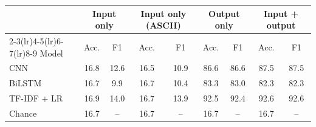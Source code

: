 \begin{tabular}{lcccccccc}
\toprule
 & \multicolumn{2}{c}{Input only} & \multicolumn{2}{c}{Input only (ASCII)} & \multicolumn{2}{c}{Output only} & \multicolumn{2}{c}{Input + output} \\
\cmidrule(lr){2-3}\cmidrule(lr){4-5}\cmidrule(lr){6-7}\cmidrule(lr){8-9}
Model & Acc. & F1 & Acc. & F1 & Acc. & F1 & Acc. & F1 \\
\midrule
CNN & 16.8 & 12.6 & 16.5 & 10.9 & 86.6 & 86.6 & 87.5 & 87.5 \\
BiLSTM & 16.7 & 9.9 & 16.7 & 10.4 & 83.3 & 83.0 & 82.3 & 82.3 \\
TF-IDF + LR & 16.9 & 14.0 & 16.7 & 13.9 & 92.5 & 92.4 & 92.6 & 92.6 \\
\midrule
Chance & 16.7 & -- & 16.7 & -- & 16.7 & -- & 16.7 & -- \\
\bottomrule
\end{tabular}
